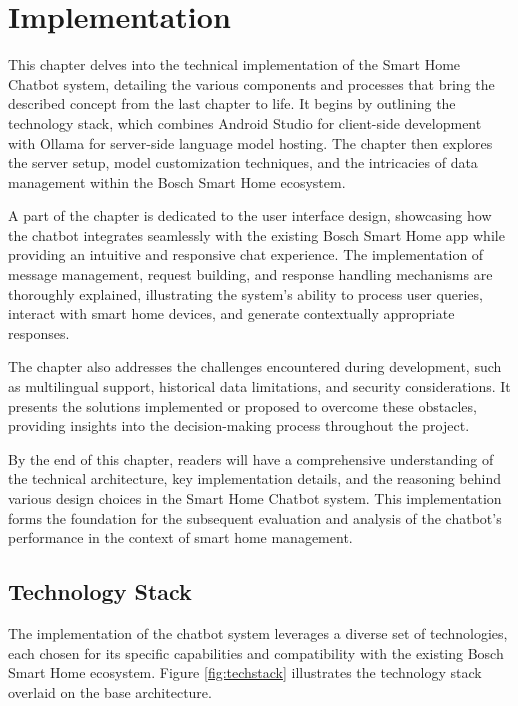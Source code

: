 
\chapter{Implementation}
This chapter delves into the technical implementation of the Smart Home Chatbot system, detailing the various components and processes that bring the described concept from the last chapter to life. It begins by outlining the technology stack, which combines Android Studio for client-side development with Ollama for server-side language model hosting. The chapter then explores the server setup, model customization techniques, and the intricacies of data management within the Bosch Smart Home ecosystem.

A part of the chapter is dedicated to the user interface design, showcasing how the chatbot integrates seamlessly with the existing Bosch Smart Home app while providing an intuitive and responsive chat experience. The implementation of message management, request building, and response handling mechanisms are thoroughly explained, illustrating the system's ability to process user queries, interact with smart home devices, and generate contextually appropriate responses.

The chapter also addresses the challenges encountered during development, such as multilingual support, historical data limitations, and security considerations. It presents the solutions implemented or proposed to overcome these obstacles, providing insights into the decision-making process throughout the project.

By the end of this chapter, readers will have a comprehensive understanding of the technical architecture, key implementation details, and the reasoning behind various design choices in the Smart Home Chatbot system. This implementation forms the foundation for the subsequent evaluation and analysis of the chatbot's performance in the context of smart home management.

\label{chap:implementation}

\section{Technology Stack}
The implementation of the chatbot system leverages a diverse set of technologies, each chosen for its specific capabilities and compatibility with the existing Bosch Smart Home ecosystem. Figure \ref{fig:techstack} illustrates the technology stack overlaid on the base architecture.

